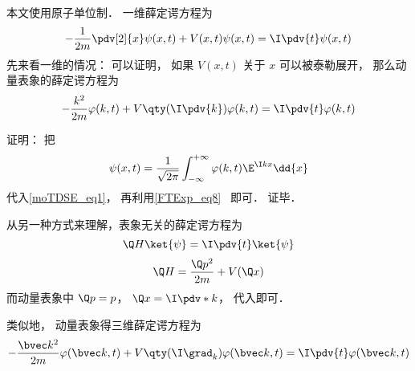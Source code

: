

本文使用原子单位制． 一维薛定谔方程为
\begin{equation}\label{moTDSE_eq1}
-\frac{1}{2m} \pdv[2]{x}\psi(x, t) + V(x,t)\psi(x,t) = \I \pdv{t} \psi(x,t)
\end{equation}
先来看一维的情况： 可以证明， 如果 $V(x,t)$ 关于 $x$ 可以被泰勒展开， 那么动量表象的薛定谔方程为
\begin{equation}
-\frac{k^2}{2m}\varphi(k, t) + V\qty(\I \pdv{k})\varphi(k, t) = \I \pdv{t} \varphi(k,t)
\end{equation}

证明： 把
\begin{equation}
\psi(x,t) = \frac{1}{\sqrt{2\pi}}\int_{-\infty}^{+\infty} \varphi(k,t)\E^{\I kx}\dd{x}
\end{equation}
代入\autoref{moTDSE_eq1}， 再利用\autoref{FTExp_eq8}~ 即可． 证毕．

从另一种方式来理解，表象无关的薛定谔方程为
\begin{equation}
\Q H\ket{\psi} = \I \pdv{t}\ket{\psi}
\end{equation}
\begin{equation}
\Q H = \frac{\Q p^2}{2m} + V(\Q x)
\end{equation}
而动量表象中 $\Q p = p$， $\Q x  = \I \pdv*{k}$， 代入即可．


类似地， 动量表象得三维薛定谔方程为
\begin{equation}
-\frac{\bvec k^2}{2m}\varphi(\bvec k, t) + V\qty(\I \grad_k)\varphi(\bvec k, t) = \I \pdv{t} \varphi(\bvec k,t)
\end{equation}
